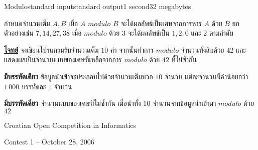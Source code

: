 \documentclass[11pt,a4paper]{article}
\begin{document}
\begin{problem}{Modulo}{standard input}{standard output}{1 second}{32 megabytes}

กำหนดจำนวนเต็ม $A,B$ เมื่อ $A$ $modulo$ $B$ จะได้ผลลัพธ์เป็นเศษจากการหาร $A$ ด้วย $B$ ยกตัวอย่างเช่น $7 , 14 , 27 , 38$ เมื่อ $modulo$ ด้วย $3$ จะได้ผลลัพธ์เป็น $1 , 2 , 0$ และ $2$ ตามลำดับ 


\underline{\textbf{โจทย์}} จงเขียนโปรแกรมรับจำนวนเต็ม $10$ ค่า จากนั้นทำการ $modulo$ จำนวนทั้งสิบด้วย $42$ และแสดงผลเป็นจำนวนแบบของเศษที่เหลือจากการ $modulo$ ด้วย $42$ ที่ไม่ซ้ำกัน

\InputFile

\textbf{มีบรรทัดเดียว} ข้อมูลนำเข้าจะประกอบไปด้วยจำนวนเต็มบวก $10$ จำนวน แต่ละจำนวนมีค่าน้อยกว่า $1\,000$ บรรทัดละ $1$ จำนวน

\OutputFile

\textbf{มีบรรทัดเดียว} จำนวนแบบของเศษที่ไม่ซ้ำกัน เมื่อนำทั้ง $10$ จำนวนจากข้อมูลนำเข้ามา $modulo$ ด้วย $42$

\Examples

\begin{example}
%
\end{example}
\begin{example}
%
%
\end{example}

\Source

Croatian Open Competition in Informatics

Contest 1 – October 28, 2006

\end{problem}
\end{document}
